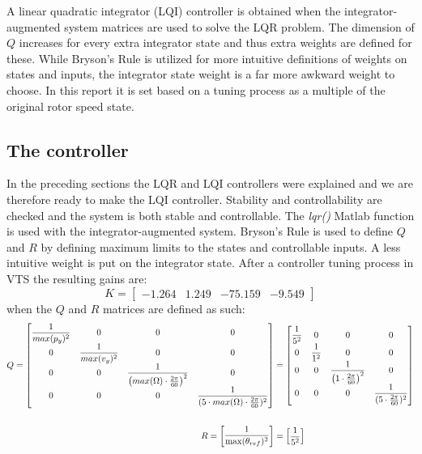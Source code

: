 A linear quadratic integrator (LQI) controller is obtained when the integrator-augmented system matrices are used to solve the LQR problem. The dimension of $ Q $ increases for every extra integrator state and thus extra weights are defined for these. While Bryson's Rule is utilized for more intuitive definitions of weights on states and inputs, the integrator state weight is a far more awkward weight to choose. In this report it is set based on a tuning process as a multiple of the original rotor speed state.


\subsection{The controller} \label{sec:ctrl_thecontroller}
In the preceding sections the LQR and LQI controllers were explained and we are therefore ready to make the LQI controller. Stability and controllability are checked and the system is both stable and controllable. The \textit{lqr()} Matlab function is used with the integrator-augmented system. Bryson's Rule is used to define $ Q $ and $ R $ by defining maximum limits to the states and controllable inputs. A less intuitive weight is put on the integrator state. After a controller tuning process in VTS the resulting gains are:
\begin{equation}\label{eq:lqi_K}
	K = \begin{bmatrix} -1.264 &  1.249 & -75.159 & -9.549 \end{bmatrix}
\end{equation}
when the $ Q $ and $ R $ matrices are defined as such:
\begin{equation}\label{eq:lqi_Q_and_R}
	\begin{split}
		Q = \begin{bmatrix}
			\dfrac{1}{max(p_y)^2}& 0 					& 0 															& 0 \cr
			0 					& \dfrac{1}{max(v_y)^2}	& 0 															& 0 \cr
			0 					& 0 					& \dfrac{1}{\left( max(\Omega) \cdot \frac{2 \pi}{60} \right)^2} & 0 \cr
			0 					& 0 					& 0 															& \dfrac{1}{(5 \cdot max(\Omega) \cdot \frac{2 \pi}{60})^2} \end{bmatrix} & = \begin{bmatrix}
			\dfrac{1}{5^2} 	&  	0 				&  0 										&  0 \cr
			0 				&  \dfrac{1}{1^2}	&  0 										&  0 \cr
			0 				&  0 				& \dfrac{1}{\left( 1 \cdot \frac{2 \pi}{60} \right)^2} 	&  0 \cr
			0 				&  0 				&  0 										&  \dfrac{1}{(5 \cdot \frac{2 \pi}{60})^2}
		\end{bmatrix} \\\\
		R = \begin{bmatrix} \dfrac{1}{\max(\theta_{ref})^2} \end{bmatrix} &= \begin{bmatrix} \dfrac{1}{5^2} \end{bmatrix}
	\end{split}
\end{equation}
